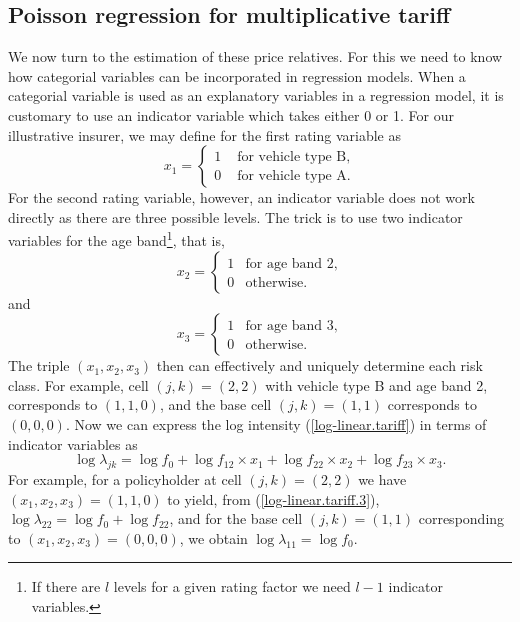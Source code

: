 \documentclass[12pt]{article}
\begin{document}
\subsection{Poisson regression for multiplicative tariff}
We now turn to the estimation of these price relatives. For this we need to know how categorial variables can be incorporated in regression models. When a categorial variable is used as an explanatory variables in a regression model, it is customary to use an indicator variable which takes either 0 or 1. For our illustrative insurer, we may define for the first rating variable as
\begin{equation}
\label{ind.x1}x_1=
\begin{cases}
      1 & \text{ for vehicle type B}, \\
      0 & \text{ for vehicle type A}.
\end{cases}
\end{equation} 
For the second rating variable, however, an indicator variable does not work directly as there are three possible levels. The trick is to use two indicator variables for the age band\footnote{If there are $l$ levels for a given rating factor we need $l-1$ indicator variables.}, that is,
\begin{equation}
\label{ind.x2}x_2=
\begin{cases}
     1 & \text{for age band 2}, \\
     0 & \text{otherwise}.
\end{cases}
\end{equation} and 
\begin{equation}
\label{ind.x3}x_3=
\begin{cases}
     1 & \text{for age band 3}, \\
     0 & \text{otherwise}.
\end{cases}
\end{equation} The triple $(x_1, x_2, x_3)$ then can effectively and uniquely determine each risk class. For example, cell $(j,k)=(2,2)$ with vehicle type B and age band 2, corresponds to $(1, 1, 0)$, and the base cell $(j,k)=(1,1)$ corresponds to $(0, 0, 0)$.
Now we can express the log intensity (\ref{log-linear.tariff}) in terms of indicator variables as  
\begin{equation}
\label{log-linear.tariff.3}
\log \lambda_{jk}= \log f_0+ \log f_{12}  \times x_1 + \log f_{22} \times x_2 +\log f_{23} \times x_3.
\end{equation} For example, for a policyholder at cell $(j,k)=(2,2)$ we have $(x_1, x_2,x_3)=(1,1,0)$ to yield, from (\ref{log-linear.tariff.3}),  $\log \lambda_{22}=\log f_0+\log f_{22}$, and for the  base cell $(j,k)=(1,1)$ corresponding to $(x_1, x_2,x_3)=(0, 0, 0)$, we obtain $\log \lambda_{11}=\log f_0$.
\end{document}
